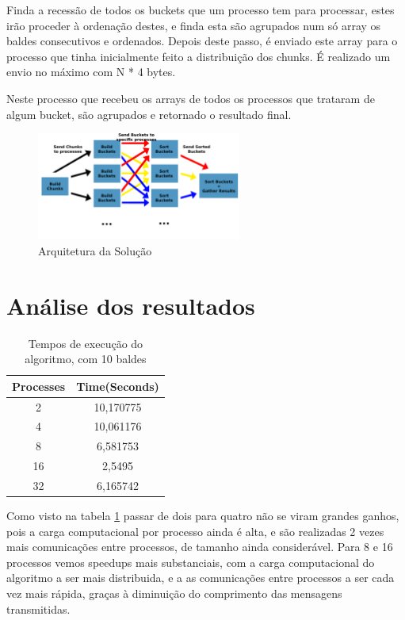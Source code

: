 \documentclass[a4paper]{report}
\begin{document}
Finda a recessão de todos os buckets que um processo tem para processar, estes
irão proceder à ordenação destes, e finda esta são agrupados num só array os
baldes consecutivos e ordenados. Depois deste passo, é enviado este array para o
processo que tinha inicialmente feito a distribuição dos chunks. É realizado um
envio no máximo com N * 4 bytes.

Neste processo que recebeu os arrays de todos os processos que trataram de algum
bucket, são agrupados e retornado o resultado final.

\begin{figure}[h]
    \centering
    \includegraphics[width=0.6\textwidth]{images/esquemas/algoritmo_graph2.png}
    \caption{Arquitetura da Solução}
\end{figure}

\pagebreak
\section{Análise dos resultados}
\begin{table}[h]
    \centering
    \begin{tabular}{|c|c|}
        \hline
        Processes & Time(Seconds) \\ \hline
        2         & 10,170775     \\ \hline
        4         & 10,061176     \\ \hline
        8         & 6,581753      \\ \hline
        16        & 2,5495        \\ \hline
        32        & 6,165742      \\ \hline
    \end{tabular}
    \caption{\label{tab:Times}Tempos de execução do algoritmo, com 10 baldes}
\end{table}

Como visto na tabela \ref{tab:Times} passar de dois para quatro não
se viram grandes ganhos, pois a carga computacional por processo ainda
é alta, e são realizadas 2 vezes mais comunicações entre processos,
de tamanho ainda considerável. Para 8 e 16 processos vemos speedups
mais substanciais, com a carga computacional do algoritmo a ser
mais distribuida, e a as comunicações entre processos a ser cada
vez mais rápida, graças à diminuição do comprimento das mensagens transmitidas.
\end{document}
